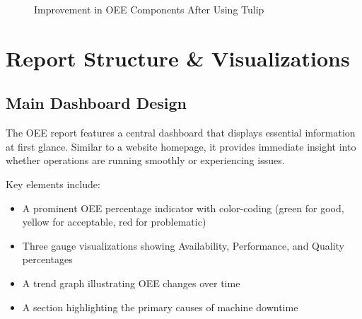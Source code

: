 \documentclass{article}
\begin{document}
\begin{figure}[H]
\centering
{}
\caption{Improvement in OEE Components After Using Tulip}
\end{figure}

\section{Report Structure \& Visualizations}

\subsection{Main Dashboard Design}
The OEE report features a central dashboard that displays essential information at first glance. Similar to a website homepage, it provides immediate insight into whether operations are running smoothly or experiencing issues.

Key elements include:
\begin{itemize}
    \item A prominent OEE percentage indicator with color-coding (green for good, yellow for acceptable, red for problematic)
    \item Three gauge visualizations showing Availability, Performance, and Quality percentages
    \item A trend graph illustrating OEE changes over time
    \item A section highlighting the primary causes of machine downtime
\end{itemize}
\end{document}
